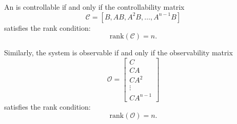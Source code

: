 \begin{definition}\label{def:kalman-rank}
    An  is controllable if and only if the controllability matrix 
    \[
        \mathcal{C} = [B, AB, A^2B, \ldots, A^{n-1}B]
    \]
    satisfies the rank condition:
    \[
        \mathrm{rank}(\mathcal{C}) = n.
    \]
    
    Similarly, the system is observable if and only if the observability matrix
    \[
        \mathcal{O} = \begin{bmatrix}
        C \\
        CA \\
        CA^2 \\
        \vdots \\
        CA^{n-1}
        \end{bmatrix}
    \]
    satisfies the rank condition:
    \[
        \mathrm{rank}(\mathcal{O}) = n.
    \]
\end{definition}
